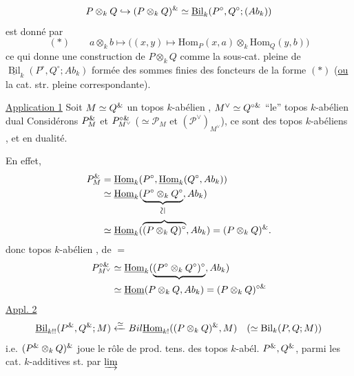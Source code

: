 \[
P\otimes_kQ\hookrightarrow(P\otimes_kQ)^{{\&}}
\simeq\underline{\operatorname{Bil}}_k(P^\circ,Q^\circ;(Ab_k))
\]
est donné par
\[
(*)\qquad a\otimes_kb\longmapsto
\big((x,y)\longmapsto\mathrm{Hom}_P(x,a)\otimes_k\mathrm{Hom}_Q(y,b)\big)
\]
ce qui donne une construction  de
$P\otimes_kQ$ comme la sous-cat. pleine de
$\underline{\operatorname{Bil}}_k(P^\circ,Q^\circ;Ab_k)$
formée des sommes finies des foncteurs de la forme $(*)$
(\uline{ou} la cat. str. pleine correspondante).

\uline{Application 1} Soit $M\simeq Q^{{\&}}$ un topos $k$-abélien ,
$M^\vee\simeq Q^{\circ{\&}}$ ``le'' topos $k$-abélien  dual
Considérons $P_M^{{\&}}$ et $P_{M^\vee}^{\circ{\&}}$
($\simeq\mathcal P_M$ et $(\mathcal P^\vee)_{M^\vee}$),
ce sont des topos $k$-abéliens , et en dualité.

En effet,
\[
\begin{aligned}
P_M^{\unsure{\&}}&=\underline{\mathrm{Hom}}_k(P^\circ,\underline{\mathrm{Hom}}_k(Q^\circ,Ab_k))\\
&\simeq\underline{\mathrm{Hom}}_k(\underbrace{P^\circ\otimes_kQ^\circ}_{\rotatebox{90}{$\simeq$}},Ab_k)\\
&\simeq\underline{\mathrm{Hom}}_k(\overbrace{(P\otimes_kQ)^\circ},Ab_k)
=(P\otimes_kQ)^{\unsure{\&}}.
\end{aligned}
\]
donc topos $k$-abélien , de $=$
\[
\begin{aligned}
P_{M^\vee}^{\circ{\&}}&\simeq\underline{\mathrm{Hom}}_k(
\underbrace{(P^\circ\otimes_kQ^\circ)^\circ},Ab_k)\\
&\simeq\underline{\mathrm{Hom}}(P\otimes_kQ,Ab_k)
=(P\otimes_kQ)^{\circ{\&}}
\end{aligned}
\]
\uline{Appl. 2}
\[
\underline{\operatorname{Bil}}_{k!!}(P^{{\&}},Q^{{\&}};M)
\xleftarrow{\simeq}{{Bil}}
\underline{\mathrm{Hom}}_{k!}((P\otimes_kQ)^{{\&}},M)
\quad(\simeq\operatorname{Bil}_k(P,Q;{M}))
\]
\margin{$\unsure{*}$}
i.e. $(P^{{{\&}}}\otimes_kQ)^{{\&}}$
joue le rôle de prod. tens. des topos $k$-abél. $P^{{\&}},Q^{{\&}}$,
parmi les cat. $k$-additives st. par $\varinjlim$
